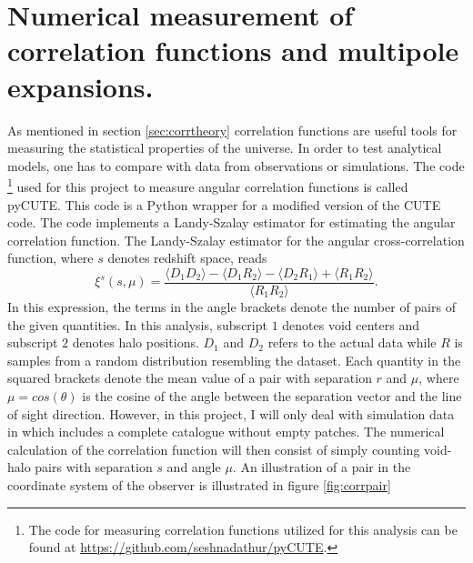 \section{Numerical measurement of correlation functions and multipole expansions.}\label{sec:numerical_corr}
As mentioned in section \ref{sec:corrtheory} correlation functions are useful
tools for measuring the statistical properties of the universe. In order to test
analytical models, one has to compare with data from observations or simulations.
The code \footnote{The code for measuring correlation functions utilized for this analysis can be found at \url{https://github.com/seshnadathur/pyCUTE}.} used for this project to measure angular correlation functions
is called pyCUTE. This code is a Python wrapper for a modified version of the CUTE\cite{alonso2013cute} code. The code implements a Landy-Szalay estimator \cite{Landy} for estimating the angular correlation function. The Landy-Szalay estimator
for the angular cross-correlation function, where $s$ denotes redshift space, reads
\begin{equation}
    \xi^s(s,\mu)=\frac{\langle D_1D_2\rangle-\langle D_1R_2\rangle-\langle D_2R_1\rangle+\langle R_1R_2\rangle}{\langle R_1R_2\rangle}.
\end{equation}
In this expression, the terms in the angle brackets denote the number of pairs of the given quantities. In this analysis, subscript $1$ denotes void centers and subscript $2$ denotes halo positions. $D_1$
and $D_2$ refers to the actual data while $R$ is samples from a random
distribution resembling the dataset. Each quantity in the squared brackets
denote the mean value of a pair with separation $r$ and $\mu$, where
$\mu=cos(\theta)$ is the cosine of the angle between the separation vector and
the line of sight direction. However, in this project, I will only deal with simulation data in which includes a complete catalogue without empty patches.
The numerical calculation of the correlation function will then consist of simply counting void-halo pairs with separation $s$ and angle $\mu$.
An illustration of a pair in the coordinate system
of the observer is illustrated in figure \ref{fig:corrpair}
